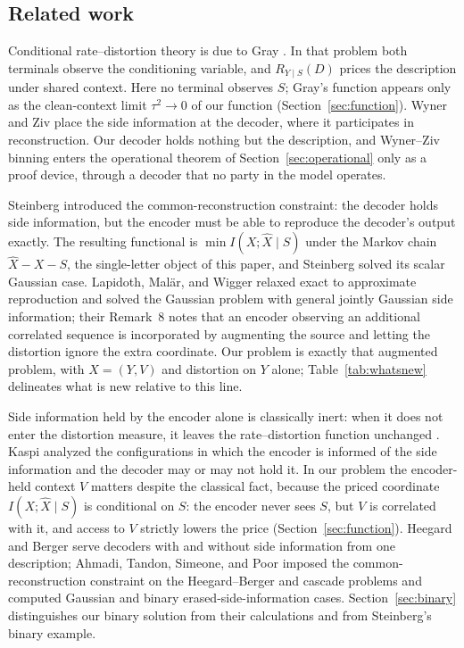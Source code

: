 ﻿\documentclass[11pt,onecolumn]{IEEEtran}
\newcommand{\hX}{\widehat{X}}
\begin{document}
\subsection*{Related work}

Conditional rate--distortion theory is due to Gray
\cite{gray1972tr,gray1973}. In that problem both terminals observe the
conditioning variable, and $R_{Y\mid S}(D)$ prices the description under
shared context. Here no terminal observes $S$; Gray's function appears
only as the clean-context limit $\tau^2\to0$ of our function
(Section~\ref{sec:function}). Wyner and Ziv \cite{wynerziv1976} place
the side information at the decoder, where it participates in
reconstruction. Our decoder holds nothing but the description, and
Wyner--Ziv binning enters the operational theorem of
Section~\ref{sec:operational} only as a proof device, through a decoder
that no party in the model operates.

Steinberg \cite{steinberg2009} introduced the common-reconstruction
constraint: the decoder holds side information, but the encoder must be
able to reproduce the decoder's output exactly. The resulting
functional is $\min I(X;\hX\mid S)$ under the Markov chain
$\hX-X-S$, the single-letter object of this paper, and Steinberg
solved its scalar Gaussian case. Lapidoth, Mal\"ar, and Wigger
\cite{lapidoth2014} relaxed exact to approximate reproduction and
solved the Gaussian problem with general jointly Gaussian side
information; their Remark~8 notes that an encoder observing an
additional correlated sequence is incorporated by augmenting the
source and letting the distortion ignore the extra coordinate. Our
problem is exactly that augmented problem, with $X=(Y,V)$ and
distortion on $Y$ alone; Table~\ref{tab:whatsnew} delineates what is
new relative to this line.

Side information held by the encoder alone is classically inert:
when it does not enter the distortion measure, it leaves the
rate--distortion function unchanged \cite{berger1971}. Kaspi
\cite{kaspi1994} analyzed the configurations in which the encoder is
informed of the side information and the decoder may or may not hold
it. In our problem the encoder-held context $V$ matters despite the
classical fact, because the priced coordinate $I(X;\hX\mid S)$ is
conditional on $S$: the encoder never sees $S$, but $V$ is correlated
with it, and access to $V$ strictly lowers the price
(Section~\ref{sec:function}). Heegard and Berger
\cite{heegardberger1985} serve decoders with and without side
information from one description; Ahmadi, Tandon, Simeone, and Poor
\cite{ahmadi2013} imposed the common-reconstruction constraint on the
Heegard--Berger and cascade problems and computed Gaussian and binary
erased-side-information cases. Section~\ref{sec:binary} distinguishes our
binary solution from their calculations and from Steinberg's binary
example.
\end{document}
